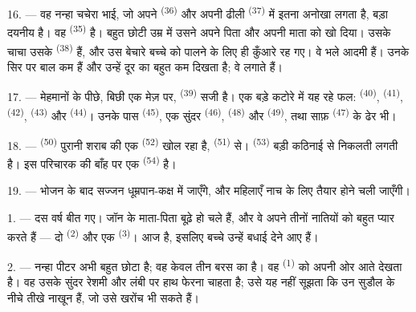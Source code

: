 16. --- वह नन्हा चचेरा भाई, जो अपने  \textsuperscript{(36)} और
अपनी ढीली  \textsuperscript{(37)} में इतना अनोखा लगता है, बड़ा
दयनीय है। वह  \textsuperscript{(35)} है। बहुत छोटी उम्र में उसने
अपने पिता और अपनी माता को खो दिया। उसके चाचा उसके 
\textsuperscript{(38)} हैं, और उस बेचारे बच्चे को पालने के लिए ही कुँआरे रह गए।
वे भले आदमी हैं। उनके सिर पर बाल कम हैं और उन्हें दूर का बहुत कम दिखता है; वे
 लगाते हैं।

\VUsaut{2.4mm}
\VUsaut{3.0mm}

17. --- मेहमानों के पीछे,  बिछी एक मेज़ पर, 
\textsuperscript{(39)} सजी है। एक बड़े कटोरे में यह रहे फल: 
\textsuperscript{(40)},  \textsuperscript{(41)}, 
\textsuperscript{(42)},  \textsuperscript{(43)} और 
\textsuperscript{(44)}। उनके पास  \textsuperscript{(45)}, एक सुंदर
 \textsuperscript{(46)},  \textsuperscript{(48)}
और  \textsuperscript{(49)}, तथा साफ़ 
\textsuperscript{(47)} के ढेर भी।

18. ---  \textsuperscript{(50)} पुरानी शराब की एक
 \textsuperscript{(52)} खोल रहा है, 
\textsuperscript{(51)} से।  \textsuperscript{(53)} बड़ी कठिनाई से निकलती लगती है। इस
परिचारक की बाँह पर एक  \textsuperscript{(54)} है।

19. --- भोजन के बाद सज्जन धूम्रपान-कक्ष में जाएँगे, और महिलाएँ नाच के लिए तैयार
होने चली जाएँगी।

\VUsaut{5.0mm}
\VUsaut{1.6mm}
\VUsaut{2.6mm}

\VUsaut{3.0mm}

1. --- दस वर्ष बीत गए। जॉन के माता-पिता बूढ़े हो चले हैं, और वे अपने तीनों
नातियों को बहुत प्यार करते हैं — दो  \textsuperscript{(2)} और एक
 \textsuperscript{(3)}। आज  है, इसलिए बच्चे
उन्हें बधाई देने आए हैं।

2. --- नन्हा पीटर अभी बहुत छोटा है; वह केवल तीन बरस का है। वह 
\textsuperscript{(1)} को अपनी ओर आते देखता है। वह उसके सुंदर रेशमी 
और लंबी  पर हाथ फेरना चाहता है; उसे यह नहीं सूझता कि उन सुडौल
 के नीचे तीखे नाखून हैं, जो उसे खरोंच भी सकते हैं।

